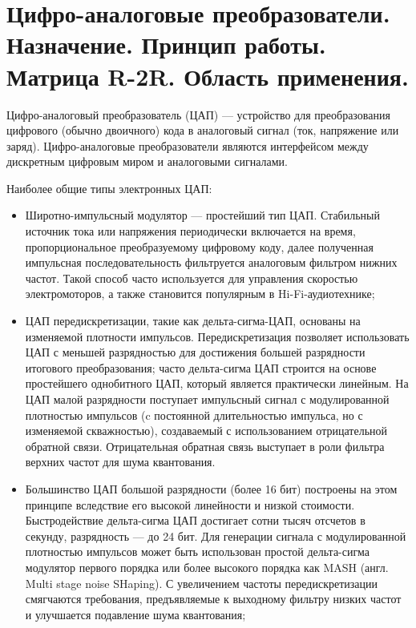 \section{Цифро-аналоговые преобразователи. Назначение. Принцип работы. Матрица R-2R. Область применения.}

Цифро-аналоговый преобразователь (ЦАП) --- устройство для преобразования цифрового (обычно двоичного) кода в аналоговый сигнал (ток, напряжение или заряд). Цифро-аналоговые преобразователи являются интерфейсом между дискретным цифровым миром и аналоговыми сигналами.

Наиболее общие типы электронных ЦАП:

\begin{itemize}
\item Широтно-импульсный модулятор --- простейший тип ЦАП. Стабильный источник тока или напряжения периодически включается на время, пропорциональное преобразуемому цифровому коду, далее полученная импульсная последовательность фильтруется аналоговым фильтром нижних частот. Такой способ часто используется для управления скоростью электромоторов, а также становится популярным в Hi-Fi-аудиотехнике;

\item ЦАП передискретизации, такие как дельта-сигма-ЦАП, основаны на изменяемой плотности импульсов. Передискретизация позволяет использовать ЦАП с меньшей разрядностью для достижения большей разрядности итогового преобразования; часто дельта-сигма ЦАП строится на основе простейшего однобитного ЦАП, который является практически линейным. На ЦАП малой разрядности поступает импульсный сигнал с модулированной плотностью импульсов (c постоянной длительностью импульса, но с изменяемой скважностью), создаваемый с использованием отрицательной обратной связи. Отрицательная обратная связь выступает в роли фильтра верхних частот для шума квантования.

\item Большинство ЦАП большой разрядности (более 16 бит) построены на этом принципе вследствие его высокой линейности и низкой стоимости. Быстродействие дельта-сигма ЦАП достигает сотни тысяч отсчетов в секунду, разрядность --- до 24 бит. Для генерации сигнала с модулированной плотностью импульсов может быть использован простой дельта-сигма модулятор первого порядка или более высокого порядка как MASH (англ. Multi stage noise SHaping). С увеличением частоты передискретизации смягчаются требования, предъявляемые к выходному фильтру низких частот и улучшается подавление шума квантования;


\end{itemize}
